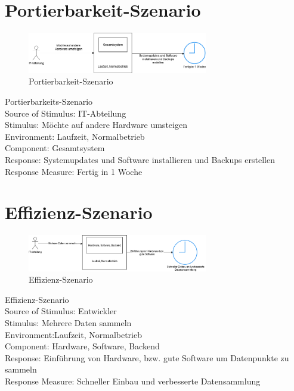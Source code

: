 \section{Portierbarkeit-Szenario}
\begin{figure}[tbh]
  \centering
  \includegraphics[width=0.7\textwidth]{Graphics/Portierbarkeit.png}
  \caption{Portierbarkeit-Szenario}
  \label{fig:Qualitaet4}
\end{figure}



Portierbarkeits-Szenario\\
Source of Stimulus: IT-Abteilung\\
Stimulus: Möchte auf andere Hardware umsteigen\\
Environment: Laufzeit, Normalbetrieb\\
Component: Gesamtsystem\\
Response: Systemupdates und Software installieren und Backups erstellen \\
Response Measure: Fertig in 1 Woche\\



\section{Effizienz-Szenario}
\begin{figure}[tbh]
  \centering
  \includegraphics[width=0.7\textwidth]{Graphics/Effizienz.png}
  \caption{Effizienz-Szenario}
  \label{fig:Qualitaet5}
\end{figure}



Effizienz-Szenario\\
Source of Stimulus: Entwickler\\
Stimulus: Mehrere Daten sammeln\\
Environment:Laufzeit, Normalbetrieb\\
Component: Hardware, Software, Backend\\
Response: Einführung von Hardware, bzw. gute Software um Datenpunkte zu sammeln\\
Response Measure: Schneller Einbau und verbesserte Datensammlung\\



